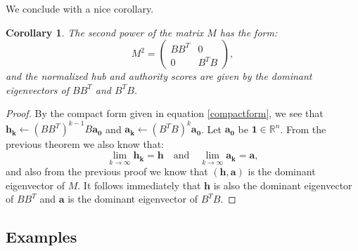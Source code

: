 \documentclass[a4paper,11pt]{report}
\newtheorem{corollary}[theorem]{Corollary}
\newcommand{\R}{{\mathbb R}}
\begin{document}
We conclude with a nice corollary.

\begin{corollary}
The second power of the matrix $M$ has the form:
$$M^2 = \begin{pmatrix} 
BB^T & 0\\
0 & B^TB
\end{pmatrix},$$
and the normalized hub and authority scores are given by the 
dominant eigenvectors of $BB^T$ and $B^TB$.\end{corollary}
 
 \begin{proof}
     By the compact form given in equation \ref{compactform}, we see that $\mathbf{h_k} \leftarrow (BB^T)^{k-1}B\mathbf{a_0}$ 
     and $\mathbf{a_k} \leftarrow (B^TB)^{k}\mathbf{a_0}$. Let $\mathbf{a_0}$ be $\mathbf{1} \in \R^n$. From the previous theorem we 
     also know that:
     $$\lim_{k\to\infty}\mathbf{h_k} = \mathbf{h} \quad \text{and} \quad \lim_{k\to\infty}\mathbf{a_k} = \mathbf{a},$$
     and also from the previous proof we know that $(\mathbf{h}, \mathbf{a})$ is 
     the dominant eigenvector of $M$. It follows immediately that
     $\mathbf{h}$ is also the dominant eigenvector of $BB^T$ and $\mathbf{a}$ is the dominant eigenvector of 
     $B^TB$.
 \end{proof}
 \subsection{Examples}
\end{document}
